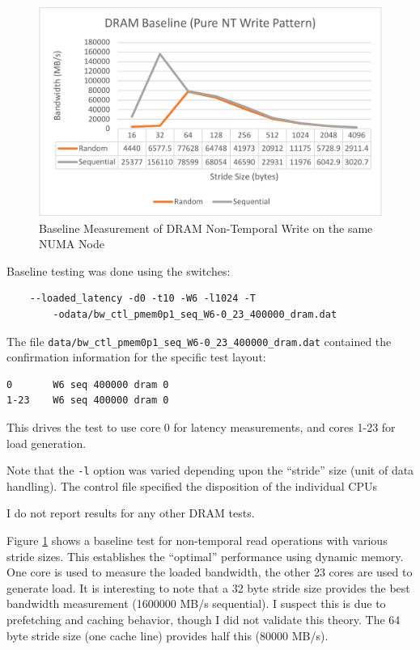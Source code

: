 \begin{figure}
    \centering
    \caption{Baseline Measurement of DRAM Non-Temporal Write on the same NUMA Node}\label{chart:baseline:dram}
    \includegraphics[width=1\textwidth]{charts/dram-baseline-nt-write-same-node-crop.pdf}
\end{figure}

Baseline testing was done using the switches:

\begin{verbatim}
    --loaded_latency -d0 -t10 -W6 -l1024 -T 
        -odata/bw_ctl_pmem0p1_seq_W6-0_23_400000_dram.dat
\end{verbatim}

The file \verb+data/bw_ctl_pmem0p1_seq_W6-0_23_400000_dram.dat+ contained the confirmation information
for the specific test layout:

\begin{verbatim}
0       W6 seq 400000 dram 0
1-23    W6 seq 400000 dram 0
\end{verbatim}

This drives the test to use core 0 for latency measurements, and cores 1-23 for load generation.

Note that the \verb+-l+ option was varied depending upon the ``stride'' size (unit of data handling).
The control file specified the disposition of the individual CPUs

I do not report results for any other DRAM tests.

Figure \ref{chart:baseline:dram} shows a baseline test for
non-temporal read operations with various stride sizes.  This
establishes the ``optimal'' performance using dynamic memory. One core
is used to measure the loaded bandwidth, the other 23 cores are used
to generate load.  It is interesting to note that a 32 byte stride
size provides the best bandwidth measurement (1600000 MB/s 
sequential).  I suspect this is due to prefetching and caching 
behavior, though I
did not validate this theory.  The 64 byte stride size (one cache line)
provides half this (80000 MB/s). 

